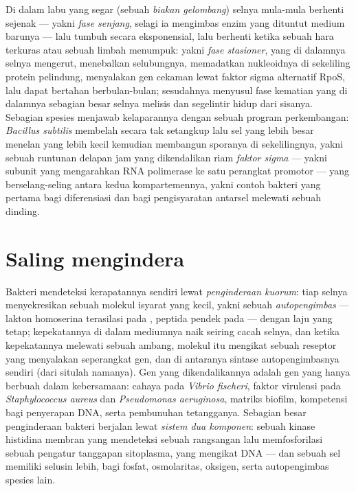 \begin{definition}\label{def:b3:bacteriology:phases}
Di dalam labu yang segar (sebuah \emph{biakan gelombang}) selnya mula-mula
berhenti sejenak --- yakni \emph{fase senjang}, selagi ia mengimbas enzim yang
dituntut medium barunya --- lalu tumbuh secara eksponensial, lalu berhenti
ketika sebuah hara terkuras atau sebuah limbah menumpuk: yakni \emph{fase
stasioner}, yang di dalamnya selnya mengerut, menebalkan selubungnya,
memadatkan nukleoidnya di sekeliling protein pelindung, menyalakan gen
cekaman lewat faktor sigma alternatif RpoS, lalu dapat bertahan berbulan-bulan;
sesudahnya menyusul fase kematian yang di dalamnya sebagian besar selnya
melisis dan segelintir hidup dari sisanya. Sebagian spesies menjawab
kelaparannya dengan sebuah program perkembangan: \emph{Bacillus
subtilis} membelah secara tak setangkup lalu sel yang lebih besar menelan yang
lebih kecil kemudian membangun sporanya di sekelilingnya, yakni sebuah runtunan
delapan jam yang dikendalikan riam \emph{faktor sigma} --- yakni subunit yang
mengarahkan RNA polimerase ke satu perangkat promotor --- yang berselang-seling
antara kedua kompartemennya, yakni contoh bakteri yang pertama bagi
diferensiasi dan bagi pengisyaratan antarsel melewati sebuah dinding.
\end{definition}

\section{Saling mengindera}

\begin{definition}\label{def:b3:bacteriology:quorum}
Bakteri mendeteksi kerapatannya sendiri lewat \emph{penginderaan kuorum}: tiap
selnya menyekresikan sebuah molekul isyarat yang kecil, yakni sebuah
\emph{autopengimbas} --- lakton homoserina terasilasi pada ,
peptida pendek pada  --- dengan laju yang tetap; kepekatannya di
dalam mediumnya naik seiring cacah selnya, dan ketika kepekatannya melewati
sebuah ambang, molekul itu mengikat sebuah reseptor yang menyalakan seperangkat
gen, dan di antaranya sintase autopengimbasnya sendiri (dari situlah namanya).
Gen yang dikendalikannya adalah gen yang hanya berbuah dalam kebersamaan:
cahaya pada \emph{Vibrio fischeri}, faktor virulensi pada
\emph{Staphylococcus aureus} dan \emph{Pseudomonas aeruginosa}, matriks
biofilm, kompetensi bagi penyerapan DNA, serta pembunuhan tetangganya. Sebagian
besar penginderaan bakteri berjalan lewat \emph{sistem dua komponen}: sebuah
kinase histidina membran yang mendeteksi sebuah rangsangan lalu memfosforilasi
sebuah pengatur tanggapan sitoplasma, yang mengikat DNA --- dan sebuah sel
memiliki selusin lebih, bagi fosfat, osmolaritas, oksigen, serta autopengimbas
spesies lain.
\end{definition}

